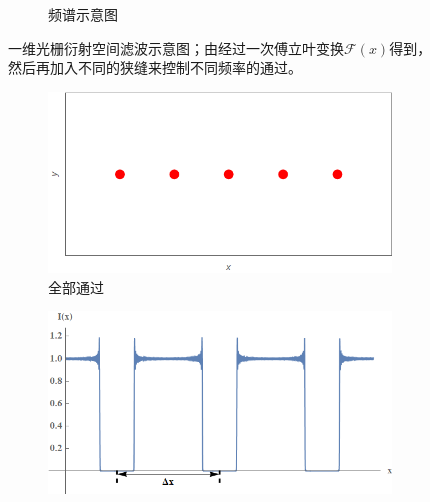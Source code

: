 \documentclass[a4paper]{article}
\begin{document}
\begin{figure}[H]
\begin{subfigure}[t]{0.45\textwidth}
        \caption{频谱示意图}
        \label{fig3-2}
    \end{subfigure}
    \captionsetup{justification=centering,subrefformat=parens,margin=2cm}
    \caption{一维光栅衍射空间滤波示意图；由经过一次傅立叶变换$\mathcal{F}(x)$得到，然后再加入不同的狭缝来控制不同频率的通过。}
\end{figure}
\begin{figure}[H]\ContinuedFloat
    \centering
    \begin{subfigure}[t]{0.4\textwidth}
        \centering
        \includegraphics[width=\textwidth]{simu/A.png}
        \caption{全部通过}
        \label{fig3-3-1}
    \end{subfigure}
    \begin{subfigure}[t]{0.4\textwidth}
        \centering
        \includegraphics[width=\textwidth]{simu/Aimg.png}
        \caption{}
        \label{fig3-3-2}

\end{subfigure}
\end{figure}
\end{document}
